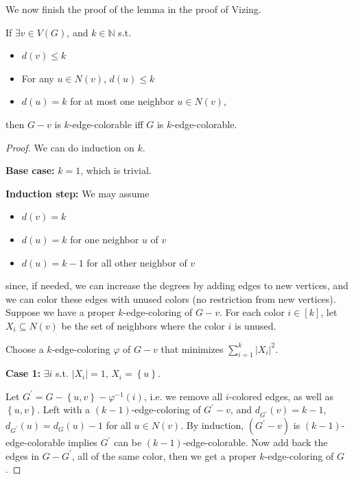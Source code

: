 We now finish the proof of the lemma in the proof of Vizing.
\begin{lemma}[Schrijver]
    If \(\exists v \in V(G)\), and \(k \in \mathbb{N}\) s.t. 
    \begin{itemize}
        \item \(d(v) \le k\)
        \item For any \(u \in N(v)\), \(d(u) \le k\) 
        \item \(d(u) = k\) for at most one neighbor \(u \in N(v)\),     
    \end{itemize}  
    then 
    \(G - v\) is \(k\)-edge-colorable iff \(G\) is \(k\)-edge-colorable.     
\end{lemma}

\begin{proof}
    We can do induction on \(k\). 

    \textbf{Base case:} \(k = 1\), which is trivial.

    \textbf{Induction step:} We may assume 
    \begin{itemize}
        \item \(d(v) = k\)
        \item \(d(u) = k\) for one neighbor \(u\) of \(v\)  
        \item \(d(u) = k - 1\) for all other neighbor of \(v\) 
    \end{itemize} 
    since, if needed, we can increase the degrees by adding edges to new vertices, and we can color these edges with unused colors (no restriction from new vertices). Suppose we have a proper \(k\)-edge-coloring of \(G - v\). For each color \(i \in [k]\), let \(X_i \subseteq N(v)\) be the set of neighbors where the color \(i\) is unused. 

    Choose a \(k\)-edge-coloring \(\varphi \) of \(G - v\) that minimizes \(\sum_{i=1}^k \vert X_i \vert^2  \).  

    \textbf{Case 1:} \(\exists i\) s.t. \(\vert X_i \vert = 1\), \(X_i = \left\{ u \right\}  \). 

    Let \(G^{\prime} = G - \left\{ u, v \right\} - \varphi ^{-1}(i) \), i.e. we remove all \(i\)-colored edges, as well as \(\left\{ u, v \right\} \). Left with a \((k - 1)\)-edge-coloring of \(G^{\prime} - v\), and \(d_{G^{\prime}} (v) = k - 1\), \(d_{G^{\prime} } (u) = d_G(u) - 1\) for all \(u \in N(v)\). By induction, \((G^{\prime} - v) \) is \((k - 1)\)-edge-colorable implies \(G^{\prime} \) can be \((k - 1)\)-edge-colorable. Now add back the edges in \(G - G^{\prime}\), all of the same color, then we get a proper \(k\)-edge-coloring of \(G\). 


\end{proof}
